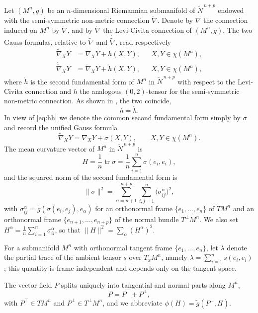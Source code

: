 \documentclass[11pt]{article}
\theoremstyle{definition}
\newcommand{\tN}{\widetilde{N}}
\newcommand{\tg}{\widetilde{g}}
\newcommand{\tnabla}{\widetilde{\nabla}}
\newcommand{\ctnabla}{\mathring{\widetilde{\nabla}}}
\newcommand{\cnabla}{\mathring{\nabla}}
\newcommand{\chr}{\chi}
\newcommand{\tr}{\operatorname{tr}}
\begin{document}
Let $(M^n,g)$ be an $n$-dimensional Riemannian submanifold of $\tN^{\,n+p}$ endowed with the semi-symmetric non-metric connection $\tnabla$. Denote by $\nabla$ the connection induced on $M^n$ by $\tnabla$, and by $\cnabla$ the Levi-Civita connection of $(M^n,g)$. The two Gauss formulas, relative to $\tnabla$ and $\ctnabla$, read respectively
\begin{align}
\tnabla_{X}Y&=\nabla_{X}Y+h(X,Y),&&X,Y\in\chr(M^n),\label{eq:gauss1}\\
\ctnabla_{X}Y&=\cnabla_{X}Y+\mathring h(X,Y),&&X,Y\in\chr(M^n),\label{eq:gauss2}
\end{align}
where $\mathring h$ is the second fundamental form of $M^n$ in $\tN^{\,n+p}$ with respect to the Levi-Civita connection and $h$ the analogous $(0,2)$-tensor for the semi-symmetric non-metric connection. As shown in \cite{AC2}, the two coincide,
\begin{equation}\label{eq:hh}
h=\mathring h.
\end{equation}
In view of \eqref{eq:hh} we denote the common second fundamental form simply by $\sigma$ and record the unified Gauss formula
\begin{equation}\label{eq:gauss-unified}
\tnabla_{X}Y=\nabla_{X}Y+\sigma(X,Y),\qquad X,Y\in\chr(M^n).
\end{equation}
The mean curvature vector of $M^n$ in $\tN^{\,n+p}$ is
\begin{equation}\label{eq:meancurv}
H=\frac1n\tr\sigma=\frac1n\sum_{i=1}^{n}\sigma(e_i,e_i),
\end{equation}
and the squared norm of the second fundamental form is
\begin{equation}\label{eq:signorm}
\|\sigma\|^2=\sum_{\alpha=n+1}^{n+p}\sum_{i,j=1}^{n}\bigl(\sigma^\alpha_{ij}\bigr)^2,
\end{equation}
with $\sigma^\alpha_{ij}=\tg(\sigma(e_i,e_j),e_\alpha)$ for an orthonormal frame $\{e_1,\dots,e_n\}$ of $TM^n$ and an orthonormal frame $\{e_{n+1},\dots,e_{n+p}\}$ of the normal bundle $T^\perp M^n$. We also set $H^\alpha=\frac1n\sum_{i=1}^{n}\sigma^\alpha_{ii}$, so that $\|H\|^2=\sum_\alpha (H^\alpha)^2$.

For a submanifold $M^n$ with orthonormal tangent frame $\{e_1,\dots,e_n\}$, let $\lambda$ denote the partial trace of the ambient tensor $s$ over $T_xM^n$, namely $\lambda=\sum_{i=1}^{n}s(e_i,e_i)$; this quantity is frame-independent and depends only on the tangent space.

The vector field $P$ splits uniquely into tangential and normal parts along $M^n$,
\begin{equation}\label{eq:Pdecomp}
P=P^\top+P^\perp,
\end{equation}
with $P^\top\in TM^n$ and $P^\perp\in T^\perp M^n$, and we abbreviate $\phi(H)=\tg(P^\perp,H)$.
\end{document}
